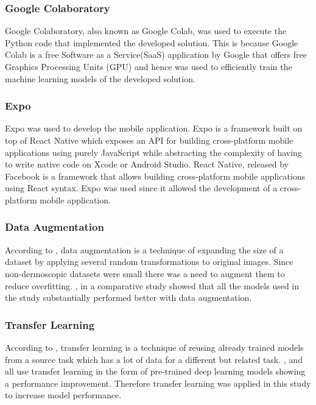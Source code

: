 \documentclass[12pt, a4paper]{article}
\begin{document}
\subsubsection{Google Colaboratory}
Google Colaboratory, also known as Google Colab, was used to execute the Python code that implemented the developed solution. This is because Google Colab is a free Software as a Service(SaaS) application by Google that offers free Graphics Processing Units (GPU) and hence was used to efficiently train the machine learning models of the developed solution.
\subsubsection{Expo}
Expo was used to develop the mobile application. Expo is a framework built on top of React Native which exposes an API for building cross-platform mobile applications using purely JavaScript while abstracting the complexity of having to write native code on Xcode or Android Studio. React Native, released by Facebook is a framework that allows building cross-platform mobile applications using React syntax. Expo was used since it allowed the development of a cross-platform mobile application.
\subsubsection{Data Augmentation}
According to \cite{perez2021convolutional}, data augmentation is a technique of expanding the size of a dataset by applying several random transformations to original images. Since non-dermoscopic datasets were small there was a need to augment them to reduce overfitting. \cite{perez2021convolutional}, in a comparative study showed that all the models used in the study substantially performed better with data augmentation.
\subsubsection{Transfer Learning}
According to \cite{perez2021convolutional}, transfer learning is a technique of reusing already trained models from a source task which has a lot of data for a different but related task. \cite{esteva2017dermatologist}, \cite{HAN20181529} and \cite{perez2021ensemble} all use transfer learning in the form of pre-trained deep learning models showing a performance improvement. Therefore transfer learning was applied in this study to increase model performance.
\clearpage
\end{document}
